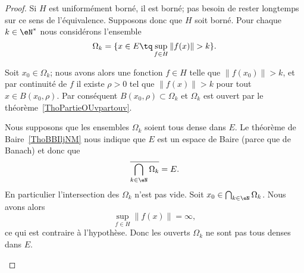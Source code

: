\begin{proof}
	Si \( H\) est uniformément borné, il est borné; pas besoin de rester longtemps sur ce sens de l'équivalence. Supposons donc que \( H\) soit borné. Pour chaque \( k\in \eN^*\) nous considérons l'ensemble
	\begin{equation}
		\Omega_k=\{ x\in E\tq \sup_{f\in H}\| f(x) \|>k \}.
	\end{equation}

	\begin{subproof}
		Soit \( x_0\in \Omega_k\); nous avons alors une fonction \( f\in H\) telle que \(  \| f(x_0) \|>k \), et par continuité de \( f\) il existe \( \rho>0\) tel que \( \| f(x) \|>k\) pour tout \( x\in B(x_0,\rho)\). Par conséquent \( B(x_0,\rho)\subset \Omega_k\) et \( \Omega_k\) est ouvert par le théorème~\ref{ThoPartieOUvpartouv}.

		Nous supposons que les ensembles \( \Omega_k\) soient tous dense dans \( E\). Le théorème de Baire~\ref{ThoBBIljNM} nous indique que \( E\) est un espace de Baire (parce que de Banach) et donc que
		\begin{equation}
			\overline{ \bigcap_{k\in \eN}\Omega_k }=E.
		\end{equation}
		En particulier l'intersection des \( \Omega_k\) n'est pas vide. Soit \( x_0\in \bigcap_{k\in \eN}\Omega_k\). Nous avons alors
		\begin{equation}
			\sup_{f\in H}\| f(x) \|=\infty,
		\end{equation}
		ce qui est contraire à l'hypothèse. Donc les ouverts \( \Omega_k\) ne sont pas tous denses dans \(E\).


\end{subproof}
\end{proof}
